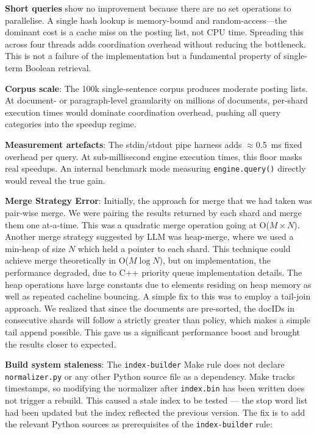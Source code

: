 \documentclass[twocolumn, 10pt]{article}
\begin{document}
\textbf{Short queries} show no improvement because there are no set
operations to parallelise. A single hash lookup is memory-bound and
random-access---the dominant cost is a cache miss on the posting list, not
CPU time. Spreading this across four threads adds coordination overhead
without reducing the bottleneck. This is not a failure of the
implementation but a fundamental property of single-term Boolean retrieval.

\textbf{Corpus scale}: The 100k single-sentence corpus produces moderate
posting lists. At document- or paragraph-level granularity on millions of
documents, per-shard execution times would dominate coordination overhead,
pushing all query categories into the speedup regime.

\textbf{Measurement artefacts}: The stdin/stdout pipe harness adds
$\approx$0.5~ms fixed overhead per query. At sub-millisecond engine
execution times, this floor masks real speedups. An internal benchmark
mode measuring \texttt{engine.query()} directly would reveal the true gain.

\textbf{Merge Strategy Error}: Initially, the approach for merge that we
had taken was pair-wise merge. We were pairing the results returned by each
shard and merge them one at-a-time. This was a quadratic merge operation
going at O($M \times N$). Another merge strategy suggested by LLM was heap-merge,
where we used a min-heap of size $N$ which held a pointer to each shard.
This technique could achieve merge theoretically in O($M\log N$), but on
implementation, the performance degraded, due to C++ priority queue implementation
details. The heap operations have large constants due to elements residing on
heap memory as well as repeated cacheline bouncing. A simple fix to this
was to employ a tail-join approach. We realized that since the documents are
pre-sorted, the docIDs in consecutive shards will follow a strictly greater than
policy, which makes a simple tail append possible. This gave us a significant
performance boost and brought the results closer to expected.

\textbf{Build system staleness}: The \texttt{index-builder} Make rule
does not declare \texttt{normalizer.py} or any other Python source file
as a dependency. Make tracks timestamps, so modifying the normalizer
after \texttt{index.bin} has been written does not trigger a rebuild.
This caused a stale index to be tested --- the stop word list had been
updated but the index reflected the previous version. The fix is to add
the relevant Python sources as prerequisites of the \texttt{index-builder}
rule:
\end{document}
